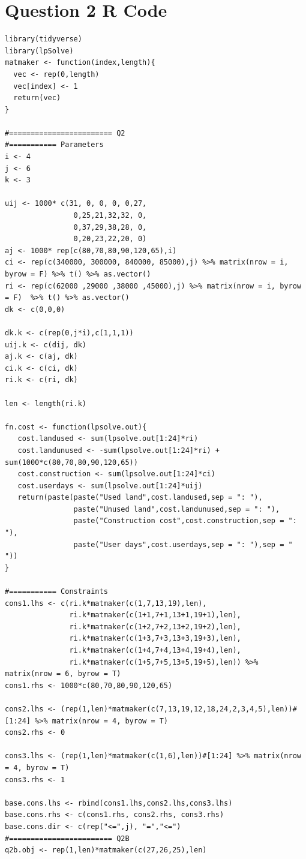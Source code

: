 \documentclass[a4paper,11pt]{article}
\begin{document}
\section{Question 2 R Code}
\begin{verbatim}
library(tidyverse)
library(lpSolve)
matmaker <- function(index,length){
  vec <- rep(0,length)
  vec[index] <- 1
  return(vec)
}

#======================== Q2
#=========== Parameters
i <- 4
j <- 6
k <- 3

uij <- 1000* c(31, 0, 0, 0, 0,27,
                0,25,21,32,32, 0,
                0,37,29,38,28, 0,
                0,20,23,22,20, 0)
aj <- 1000* rep(c(80,70,80,90,120,65),i)
ci <- rep(c(340000, 300000, 840000, 85000),j) %>% matrix(nrow = i, byrow = F) %>% t() %>% as.vector()
ri <- rep(c(62000 ,29000 ,38000 ,45000),j) %>% matrix(nrow = i, byrow = F)  %>% t() %>% as.vector()
dk <- c(0,0,0)

dk.k <- c(rep(0,j*i),c(1,1,1))
uij.k <- c(dij, dk)
aj.k <- c(aj, dk)
ci.k <- c(ci, dk)
ri.k <- c(ri, dk)

len <- length(ri.k)

fn.cost <- function(lpsolve.out){
   cost.landused <- sum(lpsolve.out[1:24]*ri)
   cost.landunused <- -sum(lpsolve.out[1:24]*ri) + sum(1000*c(80,70,80,90,120,65))
   cost.construction <- sum(lpsolve.out[1:24]*ci)
   cost.userdays <- sum(lpsolve.out[1:24]*uij)
   return(paste(paste("Used land",cost.landused,sep = ": "),
                paste("Unused land",cost.landunused,sep = ": "),
                paste("Construction cost",cost.construction,sep = ": "),
                paste("User days",cost.userdays,sep = ": "),sep = "       "))
}

#=========== Constraints
cons1.lhs <- c(ri.k*matmaker(c(1,7,13,19),len),
               ri.k*matmaker(c(1+1,7+1,13+1,19+1),len),
               ri.k*matmaker(c(1+2,7+2,13+2,19+2),len),
               ri.k*matmaker(c(1+3,7+3,13+3,19+3),len),
               ri.k*matmaker(c(1+4,7+4,13+4,19+4),len),
               ri.k*matmaker(c(1+5,7+5,13+5,19+5),len)) %>% matrix(nrow = 6, byrow = T)
cons1.rhs <- 1000*c(80,70,80,90,120,65)

cons2.lhs <- (rep(1,len)*matmaker(c(7,13,19,12,18,24,2,3,4,5),len))#[1:24] %>% matrix(nrow = 4, byrow = T)
cons2.rhs <- 0

cons3.lhs <- (rep(1,len)*matmaker(c(1,6),len))#[1:24] %>% matrix(nrow = 4, byrow = T)
cons3.rhs <- 1

base.cons.lhs <- rbind(cons1.lhs,cons2.lhs,cons3.lhs)
base.cons.rhs <- c(cons1.rhs, cons2.rhs, cons3.rhs)
base.cons.dir <- c(rep("<=",j), "=","<=")
#======================== Q2B
q2b.obj <- rep(1,len)*matmaker(c(27,26,25),len)


\end{verbatim}
\end{document}
